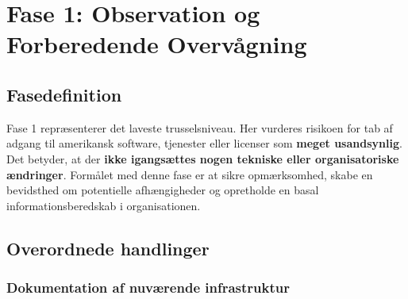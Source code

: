\documentclass[a4paper,11pt,oneside]{book}
\begin{document}
\newpage

\chapter{Fase 1: Observation og Forberedende
Overvågning}\label{fase-1-observation-og-forberedende-overvuxe5gning}

\section{Fasedefinition}\label{fasedefinition}

Fase 1 repræsenterer det laveste trusselsniveau. Her vurderes risikoen
for tab af adgang til amerikansk software, tjenester eller licenser som
\textbf{meget usandsynlig}. Det betyder, at der \textbf{ikke igangsættes
nogen tekniske eller organisatoriske ændringer}. Formålet med denne fase
er at sikre opmærksomhed, skabe en bevidsthed om potentielle
afhængigheder og opretholde en basal informationsberedskab i
organisationen.

\section{Overordnede handlinger}\label{overordnede-handlinger}

\subsection{Dokumentation af nuværende
infrastruktur}\label{dokumentation-af-nuvuxe6rende-infrastruktur}
\end{document}
